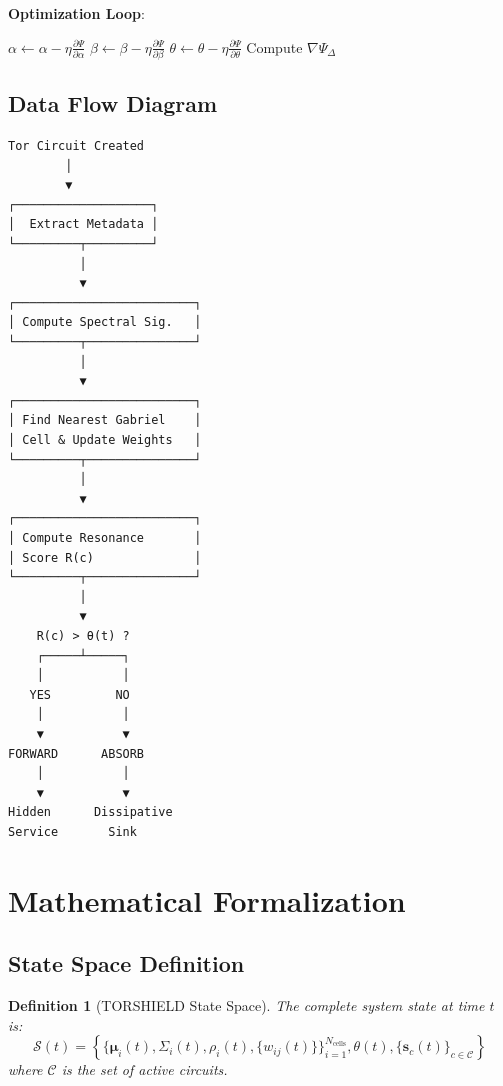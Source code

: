 \documentclass[11pt,a4paper]{article}
\newtheorem{definition}{Definition}[section]
\begin{document}
\textbf{Optimization Loop}:
\begin{algorithm}
\caption{Delta-Kernel Optimization}
\begin{algorithmic}
\WHILE{$\|\nabla \Psi_\Delta\| > \epsilon$}
    \STATE $\alpha \leftarrow \alpha - \eta \frac{\partial \Psi}{\partial \alpha}$
    \STATE $\beta \leftarrow \beta - \eta \frac{\partial \Psi}{\partial \beta}$
    \STATE $\theta \leftarrow \theta - \eta \frac{\partial \Psi}{\partial \theta}$
    \STATE Compute $\nabla \Psi_\Delta$
\ENDWHILE
\end{algorithmic}
\end{algorithm}

\subsection{Data Flow Diagram}

\begin{verbatim}
Tor Circuit Created
        │
        ▼
┌───────────────────┐
│  Extract Metadata │
└─────────┬─────────┘
          │
          ▼
┌─────────────────────────┐
│ Compute Spectral Sig.   │
└─────────┬───────────────┘
          │
          ▼
┌─────────────────────────┐
│ Find Nearest Gabriel    │
│ Cell & Update Weights   │
└─────────┬───────────────┘
          │
          ▼
┌─────────────────────────┐
│ Compute Resonance       │
│ Score R(c)              │
└─────────┬───────────────┘
          │
          ▼
    R(c) > θ(t) ?
    ┌─────┴─────┐
    │           │
   YES         NO
    │           │
    ▼           ▼
FORWARD      ABSORB
    │           │
    ▼           ▼
Hidden      Dissipative
Service       Sink
\end{verbatim}

\newpage
\section{Mathematical Formalization}

\subsection{State Space Definition}

\begin{definition}[TORSHIELD State Space]
The complete system state at time $t$ is:
\begin{equation}
\mathcal{S}(t) = \left\{ \{\boldsymbol{\mu}_i(t), \Sigma_i(t), \rho_i(t), \{w_{ij}(t)\}\}_{i=1}^{N_{\text{cells}}}, \theta(t), \{\mathbf{s}_c(t)\}_{c \in \mathcal{C}} \right\}
\end{equation}
where $\mathcal{C}$ is the set of active circuits.
\end{definition}
\end{document}
